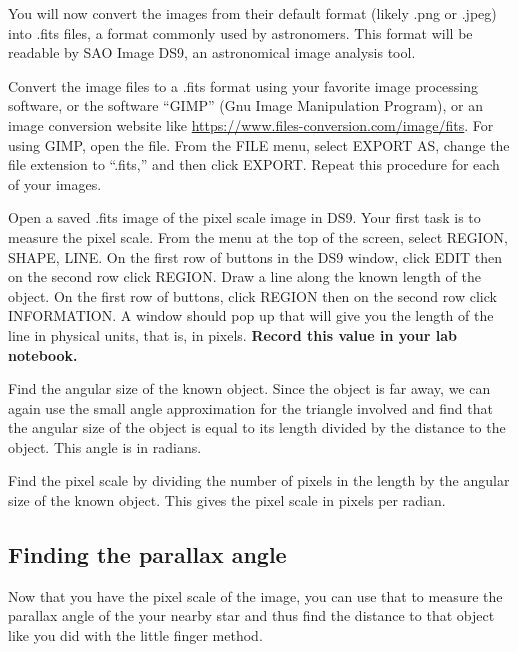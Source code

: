 You will now convert the images from their default format (likely .png or .jpeg) into .fits
files, a format commonly used by astronomers. This format will be readable by SAO
Image DS9, an astronomical image analysis tool.
\begin{steps}
	\item Convert the image files to a .fits format using your favorite image processing software, or the software ``GIMP'' (Gnu Image Manipulation Program), or an image conversion website like \url{https://www.files-conversion.com/image/fits}. For using GIMP, open the file. From the FILE menu, select EXPORT AS, change the
file extension to “.fits,” and then click EXPORT. Repeat this procedure for each of your
images.

\item Open a saved .fits image of the pixel scale image in DS9. Your first task is to measure the pixel scale.
From the menu at the top of the screen, select REGION, SHAPE, LINE. On the first row
of buttons in the DS9 window, click EDIT then on the second row click REGION. Draw
a line along the known length of the object. On the first row of buttons, click REGION then on the
second row click INFORMATION. A window should pop up that will give you the length
of the line in physical units, that is, in pixels. \textbf{Record this value in your lab notebook.}

\item Find the angular size of the known object. Since the object is far away, we can again use the small angle approximation for the triangle involved and find that the angular size of the object is equal to its length divided by the distance to the object. This angle is in radians.

\item Find the pixel scale by dividing the number of pixels in the length by the angular size of the known object. This gives the pixel scale in pixels per radian.

\end{steps}
\subsection{Finding the parallax angle}

Now that you have the pixel scale of the image, you can use that to measure the parallax angle of the your nearby star and thus find the distance to that object like you did with the little finger method.

